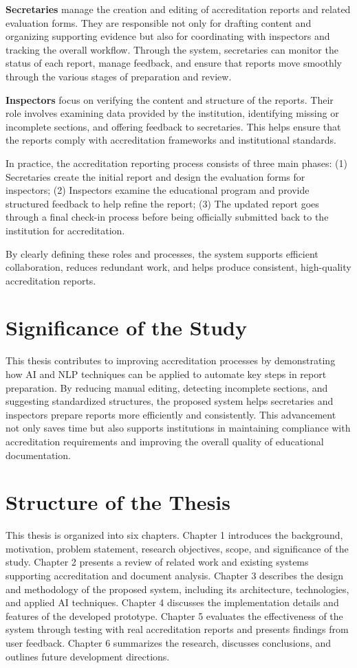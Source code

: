 \textbf{Secretaries} manage the creation and editing of accreditation reports and related evaluation forms. They are responsible not only for drafting content and organizing supporting evidence but also for coordinating with inspectors and tracking the overall workflow. Through the system, secretaries can monitor the status of each report, manage feedback, and ensure that reports move smoothly through the various stages of preparation and review.

\textbf{Inspectors} focus on verifying the content and structure of the reports. Their role involves examining data provided by the institution, identifying missing or incomplete sections, and offering feedback to secretaries. This helps ensure that the reports comply with accreditation frameworks and institutional standards.

In practice, the accreditation reporting process consists of three main phases:
(1) Secretaries create the initial report and design the evaluation forms for inspectors;
(2) Inspectors examine the educational program and provide structured feedback to help refine the report;
(3) The updated report goes through a final check-in process before being officially submitted back to the institution for accreditation.

By clearly defining these roles and processes, the system supports efficient collaboration, reduces redundant work, and helps produce consistent, high-quality accreditation reports.

\section{Significance of the Study}
This thesis contributes to improving accreditation processes by demonstrating how AI and NLP techniques can be applied to automate key steps in report preparation. By reducing manual editing, detecting incomplete sections, and suggesting standardized structures, the proposed system helps secretaries and inspectors prepare reports more efficiently and consistently. This advancement not only saves time but also supports institutions in maintaining compliance with accreditation requirements and improving the overall quality of educational documentation.
\section{Structure of the Thesis}
This thesis is organized into six chapters. 
Chapter 1 introduces the background, motivation, problem statement, research objectives, scope, and significance of the study. 
Chapter 2 presents a review of related work and existing systems supporting accreditation and document analysis. 
Chapter 3 describes the design and methodology of the proposed system, including its architecture, technologies, and applied AI techniques. Chapter 4 discusses the implementation details and features of the developed prototype. 
Chapter 5 evaluates the effectiveness of the system through testing with real accreditation reports and presents findings from user feedback. Chapter 6 summarizes the research, discusses conclusions, and outlines future development directions.

